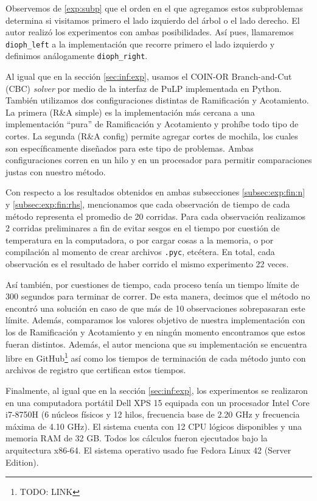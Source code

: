 Observemos de  \eqref{exp:subp} que el orden en el que agregamos estos
subproblemas determina si visitamos primero el lado izquierdo del árbol o el lado derecho. El autor
realizó los experimentos con ambas posibilidades. Así pues, llamaremos \texttt{dioph\_left} a la
implementación que recorre primero el lado izquierdo y definimos análogamente \texttt{dioph\_right}.

Al igual que en la sección \ref{sec:inf:exp}, usamos el COIN-OR Branch-and-Cut (CBC) \textit{solver}
por medio de la interfaz de PuLP implementada en Python. También utilizamos dos configuraciones
distintas de Ramificación y Acotamiento. La primera (R\&A simple) es la implementación más cercana a
una implementación ``pura'' de Ramificación y Acotamiento y prohíbe todo tipo de cortes. La segunda
(R\&A config) permite agregar cortes de mochila, los cuales son específicamente diseñados para este
tipo de problemas. Ambas configuraciones corren en un hilo y en un procesador para permitir
comparaciones justas con nuestro método.

Con respecto a los resultados obtenidos en ambas subsecciones \ref{subsec:exp:fin:n} y
\ref{subsec:exp:fin:rhs}, mencionamos que cada observación de tiempo de cada método representa el
promedio de 20 corridas. Para cada observación realizamos 2 corridas preliminares a fin
de evitar sesgos en el tiempo por cuestión de temperatura en la computadora, o por cargar cosas a la
memoria, o por compilación al momento de crear archivos \texttt{.pyc}, etcétera. En total, cada
observación es el resultado de haber corrido el mismo experimento 22 veces.

Así también, por cuestiones de tiempo, cada proceso tenía un tiempo límite de 300 segundos para
terminar de correr. De esta manera, decimos que el método no encontró una solución en caso de que
más de 10 observaciones sobrepasaran este límite. Además, comparamos los valores objetivo de nuestra
implementación con los de Ramificación y Acotamiento y en ningún momento
encontramos que estos fueran distintos. Además, el autor menciona que su implementación se
encuentra libre en GitHub\footnote{TODO: LINK} así como los tiempos de terminación de cada método
junto con archivos de registro que certifican estos tiempos.

Finalmente, al igual que en la sección \ref{sec:inf:exp}, los experimentos se realizaron en una
computadora portátil Dell XPS 15 equipada con un procesador Intel Core i7-8750H (6 núcleos físicos
y 12 hilos, frecuencia base de 2.20 GHz y frecuencia máxima de 4.10 GHz). El sistema cuenta con 12
CPU lógicos disponibles y una memoria RAM de 32 GB. Todos los cálculos fueron ejecutados bajo la
arquitectura x86-64. El sistema operativo usado fue Fedora Linux 42 (Server Edition).

